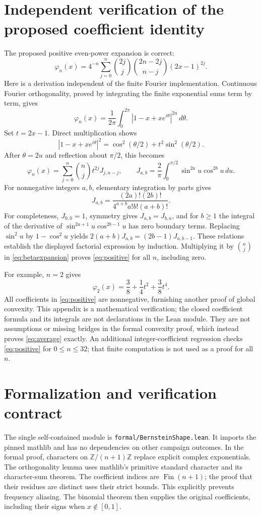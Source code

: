\documentclass[11pt]{article}
\newcommand{\ph}{\varphi}
\begin{document}
\section{Independent verification of the proposed coefficient identity}
The proposed positive even-power expansion is correct:
\begin{equation}\label{eq:positive}
 \boxed{\displaystyle
 \ph_n(x)=4^{-n}\sum_{j=0}^n
 \binom{2j}{j}\binom{2n-2j}{n-j}(2x-1)^{2j}.}
\end{equation}
Here is a derivation independent of the finite Fourier implementation.
Continuous Fourier orthogonality, proved by integrating the finite
exponential sums term by term, gives
\[
 \ph_n(x)=\frac1{2\pi}\int_0^{2\pi}|1-x+xe^{i\theta}|^{2n}\,d\theta.
\]
Set $t=2x-1$. Direct multiplication shows
\[
 |1-x+xe^{i\theta}|^2
 =\cos^2(\theta/2)+t^2\sin^2(\theta/2).
\]
After $\theta=2u$ and reflection about $\pi/2$, this becomes
\begin{equation}\label{eq:betaexpansion}
 \ph_n(x)=\sum_{j=0}^n\binom nj t^{2j}J_{j,n-j},\qquad
 J_{a,b}=\frac2\pi\int_0^{\pi/2}\sin^{2a}u\cos^{2b}u\,du.
\end{equation}
For nonnegative integers $a,b$, elementary integration by parts gives
\[
 J_{a,b}=\frac{(2a)!(2b)!}{4^{a+b}a!b!(a+b)!}.
\]
For completeness, $J_{0,0}=1$, symmetry gives $J_{a,b}=J_{b,a}$,
and for $b\geq1$ the integral of the derivative of
$\sin^{2a+1}u\cos^{2b-1}u$ has zero boundary terms. Replacing
$\sin^2u$ by $1-\cos^2u$ yields
$2(a+b)J_{a,b}=(2b-1)J_{a,b-1}$.
These relations establish the displayed factorial expression by induction.
Multiplying it by $\binom nj$ in \eqref{eq:betaexpansion} proves
\eqref{eq:positive} for all $n$, including zero.

For example, $n=2$ gives
\[
 \ph_2(x)=\frac38+\frac14t^2+\frac38t^4.
\]
All coefficients in \eqref{eq:positive} are nonnegative, furnishing another
proof of global convexity. This appendix is a mathematical verification;
the closed coefficient formula and its integrals are not declarations in
the Lean module. They are not assumptions or missing bridges in the
formal convexity proof, which instead proves \eqref{eq:average} exactly.
An additional integer-coefficient regression checks \eqref{eq:positive}
for $0\leq n\leq32$; that finite computation is not used as a proof for all $n$.

\section{Formalization and verification contract}
The single self-contained module is \texttt{formal/BernsteinShape.lean}.
It imports the pinned mathlib and has no dependencies on other campaign
outcomes. In the formal proof, characters on $\mathbb Z/(n+1)\mathbb Z$
replace explicit complex exponentials. The orthogonality lemma uses
mathlib's primitive standard character and its character-sum theorem.
The coefficient indices are $\operatorname{Fin}(n+1)$; the proof that
their residues are distinct uses their strict bounds. This explicitly
prevents frequency aliasing. The binomial theorem then supplies the
original coefficients, including their signs when $x\notin[0,1]$.
\end{document}
